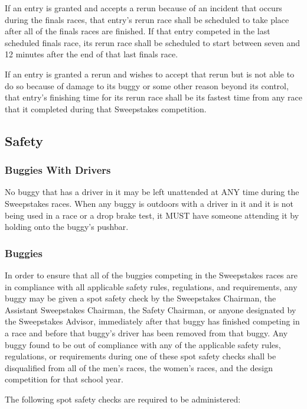 If an entry is granted and accepts a rerun because of an incident that occurs during the finals races, that entry's rerun race shall be scheduled to take place after all of the finals races are finished. If that entry competed in the last scheduled finals race, its rerun race shall be scheduled to start between seven and 12 minutes after the end of that last finals race.

If an entry is granted a rerun and wishes to accept that rerun but is not able to do so because of damage to its buggy or some other reason beyond its control, that entry's finishing time for its rerun race shall be its fastest time from any race that it completed during that Sweepstakes competition.

\subsection{Safety}

\subsubsection{Buggies With Drivers}

No buggy that has a driver in it may be left unattended at ANY time during the Sweepstakes races. When any buggy is outdoors with a driver in it and it is not being used in a race or a drop brake test, it MUST have someone attending it by holding onto the buggy's pushbar.

\subsubsection{Buggies}

In order to ensure that all of the buggies competing in the Sweepstakes races are in compliance with all applicable safety rules, regulations, and requirements, any buggy may be given a spot safety check by the Sweepstakes Chairman, the Assistant Sweepstakes Chairman, the Safety Chairman, or anyone designated by the Sweepstakes Advisor, immediately after that buggy has finished competing in a race and before that buggy's driver has been removed from that buggy. Any buggy found to be out of compliance with any of the applicable safety rules, regulations, or requirements during one of these spot safety checks shall be disqualified from all of the men's races, the women's races, and the design competition for that school year.

The following spot safety checks are required to be administered:


